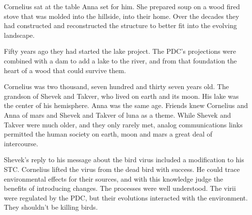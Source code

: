 Cornelius sat at the table Anna set for him.  She prepared soup on a
wood fired stove that was molded into the hillside, into their home.
Over the decades they had constructed and reconstructed the structure
to better fit into the evolving landscape.  

Fifty years ago they had started the lake project.  The PDC's projections
were combined with a dam to add a lake to the river, and from that
foundation the heart of a wood that could survive them.

\bigskip

Cornelius was two thousand, seven hundred and thirty seven years old.
The grandson of Shevek and Takver, who lived on earth and its moon.
His lake was the center of his hemisphere.  Anna was the same age.
Friends knew Cornelius and Anna of mars and Shevek and Takver of luna
as a theme.  While Shevek and Takver were much older, and they only
rarely met, analog communications links permitted the human society on
earth, moon and mars a great deal of intercourse.

\bigskip

Shevek's reply to his message about the bird virus included a
modification to his STC.  Cornelius lifted the virus from the dead
bird with success.  He could trace environmental effects for their
sources, and with this knowledge judge the benefits of introducing
changes.  The processes were well understood.  The virii were
regulated by the PDC, but their evolutions interacted with the
environment.  They shouldn't be killing birds.

\bye

